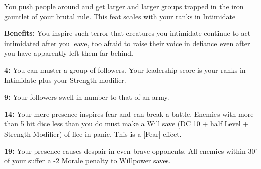 You push people around and get larger and larger groups trapped in the iron gauntlet of your brutal rule. This feat scales with your ranks in Intimidate

\textbf{Benefits:} You inspire such terror that creatures you intimidate continue to act intimidated after you leave, too afraid to raise their voice in defiance even after you have apparently left them far behind.

\textbf{4:} You can muster a group of followers. Your leadership score is your ranks in Intimidate plus your Strength modifier.

\textbf{9:} Your followers swell in number to that of an army.

\textbf{14:} Your mere presence inspires fear and can break a battle. Enemies with more than 5 hit dice less than you do must make a Will save (DC 10 + half Level + Strength Modifier) of flee in panic. This is a [Fear] effect.

\textbf{19:} Your presence causes despair in even brave opponents. All enemies within 30' of your suffer a -2 Morale penalty to Willpower saves.
